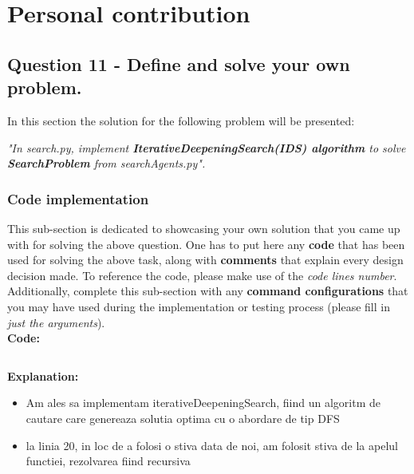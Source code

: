 \section{Personal contribution}

\subsection{Question 11 - Define and solve your own problem.}
In this section the solution for the following problem will be presented: \newline


\textit{"In search.py, implement \textbf{IterativeDeepeningSearch(IDS) algorithm} to solve {\textbf{SearchProblem}} from searchAgents.py". }

\subsubsection{Code implementation}
This sub-section is dedicated to showcasing your own solution that you came up with for solving the above question. One has to put here any \textbf{code} that has been used for solving the above task, along with \textbf{comments} that explain every design decision made. To reference the code, please make use of the \textit{code lines number}. Additionally, complete this sub-section with any \textbf{command configurations} that you may have used during the implementation or testing process (please fill in \textit{just the arguments}). \\

\textbf{Code:}

\inputminted[linenos]{python}{code/11_prop_problem.py}


\textbf{Explanation:}
\begin{itemize}
    \setlength\itemsep{0em}
    \item Am ales sa implementam iterativeDeepeningSearch, fiind un algoritm de cautare care genereaza solutia optima cu o abordare de tip DFS
\item la linia 20, in loc de a folosi o stiva data de noi, am folosit stiva de la apelul functiei, rezolvarea fiind recursiva%

\end{itemize}



